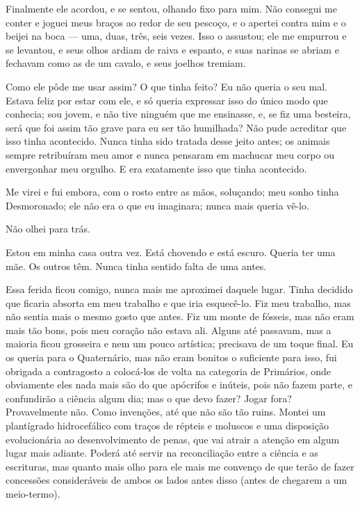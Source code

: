 Finalmente ele acordou, e se sentou, olhando fixo para mim. Não consegui me conter e
joguei meus braços ao redor de seu pescoço, e o apertei contra mim e o beijei
na boca --- uma, duas, três, seis vezes. Isso o assustou; ele me empurrou e se
levantou, e seus olhos ardiam de raiva e espanto, e suas narinas se abriam e
fechavam como as de um cavalo, e seus joelhos tremiam.

Como ele pôde me usar assim? O que tinha feito? Eu não queria o seu mal. Estava
feliz por estar com ele, e só queria expressar isso do único modo que conhecia;
sou jovem, e não tive ninguém que me ensinasse, e, se fiz uma besteira, será que foi
assim tão grave para eu ser tão humilhada? Não pude acreditar que isso tinha
acontecido. Nunca tinha sido tratada desse jeito antes; os animais sempre
retribuíram meu amor e nunca pensaram em machucar meu corpo ou envergonhar meu
orgulho. E era exatamente isso que tinha acontecido.

Me virei e fui embora, com o rosto entre as mãos, soluçando; meu sonho tinha
Desmoronado; ele não era o que eu imaginara; nunca mais queria vê-lo.

Não olhei para trás.

Estou em minha casa outra vez. Está chovendo e está escuro. Queria ter uma mãe. Os
outros têm. Nunca tinha sentido falta de uma antes.

 Essa ferida ficou comigo, nunca mais me aproximei
daquele lugar. Tinha decidido que ficaria absorta em meu trabalho e que iria
esquecê-lo. Fiz meu trabalho, mas não sentia mais o mesmo gosto que antes.
Fiz um monte de fósseis, mas não eram mais tão bons, pois meu coração não estava
ali. Alguns até passavam, mas a maioria ficou grosseira e nem um pouco artística;
precisava de um toque final. Eu os queria para o Quaternário, mas não eram bonitos
o suficiente para isso, fui obrigada a contragosto a colocá-los de volta na
categoria de Primários, onde obviamente eles nada mais são do que apócrifos e
inúteis, pois não fazem parte, e confundirão a ciência algum dia; mas o que devo
fazer? Jogar fora? Provavelmente não. Como invenções, até que não são tão
ruins. Montei um plantígrado hidrocefálico com traços de répteis e
moluscos e uma disposição evolucionária ao desenvolvimento de penas, que vai     
atrair a atenção em algum lugar mais adiante. Poderá até servir na reconciliação
entre a ciência e as escrituras, mas quanto mais olho para ele mais me convenço
de que terão de fazer concessões consideráveis de ambos os lados antes disso
(antes de chegarem a um meio-termo).

